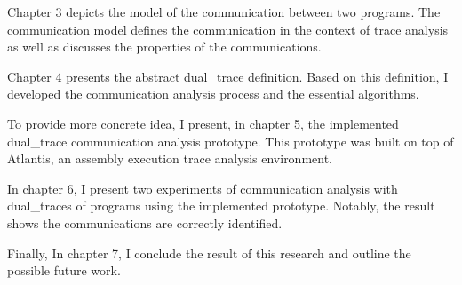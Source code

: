 Chapter 3 depicts the model of the communication between two programs. The communication model defines the communication in the context of trace analysis as well as discusses the properties of the communications. 

Chapter 4 presents the abstract dual\_trace definition. Based on this definition, I developed the communication analysis process and the essential algorithms.

To provide more concrete idea, I present, in chapter 5, the implemented dual\_trace communication analysis prototype. This prototype was built on top of Atlantis\cite{huang2017atlantis}, an assembly execution trace analysis environment.

In chapter 6, I present two experiments of communication analysis with dual\_traces of programs using the implemented prototype. Notably, the result shows the communications are correctly identified. 

Finally, In chapter 7, I conclude the result of this research and outline the possible future work.